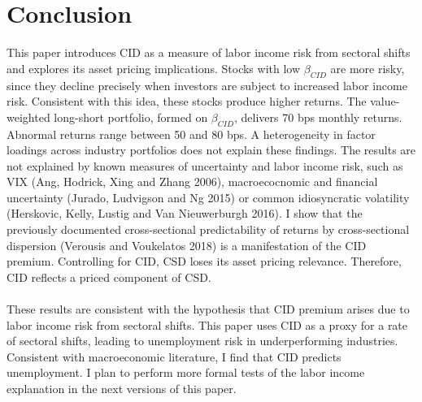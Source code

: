 \documentclass[12pt]{article}
\begin{document}
\newpage

\section{Conclusion} \label{sec:Model}

This paper introduces CID as a measure of labor income risk from sectoral shifts and explores its asset pricing implications. Stocks with low $\beta_{CID}$ are more risky, since they decline precisely when investors are subject to increased labor income risk. Consistent with this idea, these stocks produce higher returns. The value-weighted long-short portfolio, formed on $\beta_{CID}$, delivers 70 bps monthly returns. Abnormal returns range between 50 and 80 bps. A heterogeneity in factor loadings across industry portfolios does not explain these findings. The results are not explained by known measures of uncertainty and labor income risk, such as VIX (Ang, Hodrick, Xing and Zhang 2006), macroecocnomic and financial uncertainty (Jurado, Ludvigson and Ng 2015) or common idiosyncratic volatility (Herskovic, Kelly, Lustig and Van Nieuwerburgh 2016). I show that the previously documented cross-sectional predictability of returns by cross-sectional dispersion (Verousis and Voukelatos 2018) is a manifestation of the CID premium. Controlling for CID, CSD loses its asset pricing relevance. Therefore, CID reflects a priced component of CSD.
\paragraph{}
These results are consistent with the hypothesis that CID premium arises due to labor income risk from sectoral shifts. This paper uses CID as a proxy for a rate of sectoral shifts, leading to unemployment risk in underperforming industries. Consistent with macroeconomic literature, I find that CID predicts unemployment. I plan to perform more formal tests of the labor income explanation in the next versions of this paper.


\newpage
\end{document}
